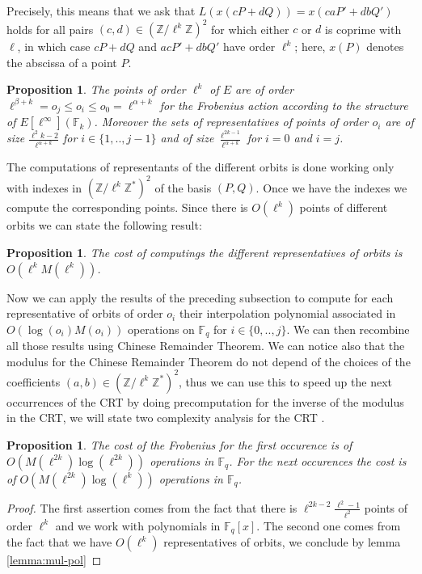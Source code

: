 \documentclass{lms}
\newtheorem{prop}[thm]{Proposition}
\newcommand{\F}{\mathbb{F}}
\begin{document}
Precisely, this means that we ask that $L(x(cP+dQ))=x(caP'+dbQ')$
holds for all pairs $(c,d) \in (\mathbb{Z}/\ell^k\mathbb{Z})^2$ for
which either $c$ or $d$ is coprime with $\ell$, in which case $cP+dQ$
and $acP'+dbQ'$ have order $\ell^k$; here, $x(P)$ denotes the abscissa
of a point $P$.  
\newline
\begin{prop}
The points of order $\ell^k$ of $E$ are of order $\ell^{\beta+k}=o_j  \leqslant o_i \leqslant o_0=  \ell^{\alpha+k} $ for the Frobenius action according to the structure of $E[\ell^\infty](\F_k)$.
\newline
Moreover the sets of representatives of points of order $o_i$ are of size $\frac{\ell^2k-2}{\ell^{\alpha+k}}$ for $i \in \{1,..,j-1\}$ and of size $\frac{\ell^{2k-1}}{\ell^{\alpha+k}}$ for $i=0$ and $i=j$.
\end{prop}
The computations of representants of the different orbits is done working only with indexes in $(\mathbb{Z}/\ell^k \mathbb{Z}^*)^2$ of the basis $(P,Q)$. Once we have the indexes we compute the corresponding points. Since there is $O(\ell^k)$ points of different orbits we can state the following result:

\begin{prop}
The cost of computings the different representatives of orbits is $O(\ell^kM(\ell^k))$.
\end{prop}
Now we can apply the results of the preceding subsection to compute for each representative of orbits of order $o_i$ their interpolation polynomial associated in $O(\log(o_i)M(o_i))$ operations on $\mathbb{F}_q$ for $i \in \{0,..,j\}$. We can then recombine all those results using Chinese Remainder Theorem. We can notice also that the modulus for the Chinese Remainder Theorem do not depend of the choices of the coefficients $(a,b) \in (\mathbb{Z}/\ell^k \mathbb{Z}^*)^2$, thus we can use this to speed up the next occurrences of the CRT by doing precomputation for the inverse of the modulus in the CRT, we will state two complexity analysis for the CRT .

\begin{prop}
The cost of the Frobenius for the first occurence is of $O(M(\ell^{2k})\log(\ell^{2k}))$ operations in $\mathbb{F}_q$. For the next occurences the cost is of $O(M(\ell^{2k})\log(\ell^{k}))$ operations in $\mathbb{F}_q$.
\end{prop}

\begin{proof}
The first assertion comes from the fact that there is $\ell^{2k-2}\frac{\ell^2-1}{\ell^2}$ points of order $\ell^k$ and we work with polynomials in $\mathbb{F}_q[x]$. The second one comes from the fact that we have $O(\ell^k)$ representatives of orbits, we conclude by lemma \ref{lemma:mul-pol}
\end{proof}
\end{document}
